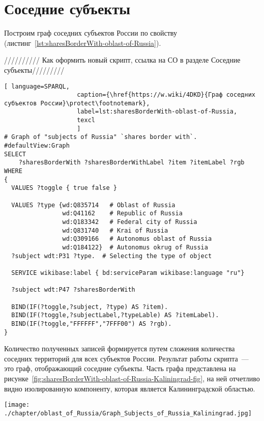 \section{Соседние субъекты}

Построим граф соседних субъектов России по свойству  (листинг~\protect\ref{lst:sharesBorderWith-oblast-of-Russia}).

////////// Как оформить новый скрипт, ссылка на СО в разделе Соседние субъекты/////////

\begin{lstlisting}[ language=SPARQL, 
                    caption={\href{https://w.wiki/4DKD}{Граф соседних субъектов России}\protect\footnotemark},
                    label=lst:sharesBorderWith-oblast-of-Russia,
                    texcl 
                    ]
# Graph of "subjects of Russia" `shares border with`. 
#defaultView:Graph
SELECT 
    ?sharesBorderWith ?sharesBorderWithLabel ?item ?itemLabel ?rgb
WHERE
{
  VALUES ?toggle { true false }
  
  VALUES ?type {wd:Q835714   # Oblast of Russia
                wd:Q41162    # Republic of Russia
                wd:Q183342   # Federal city of Russia
                wd:Q831740   # Krai of Russia
                wd:Q309166   # Autonomus oblast of Russia
                wd:Q184122}  # Autonomus okrug of Russia
  ?subject wdt:P31 ?type.  # Selecting the type of object  
  
  SERVICE wikibase:label { bd:serviceParam wikibase:language "ru"}
  
  ?subject wdt:P47 ?sharesBorderWith   
           
  BIND(IF(?toggle,?subject, ?type) AS ?item).
  BIND(IF(?toggle,?subjectLabel,?typeLable) AS ?itemLabel).
  BIND(IF(?toggle,"FFFFFF","7FFF00") AS ?rgb).
}
\end{lstlisting}%

Количество полученных записей формируется путем сложения количества соседних территорий для всех субъектов России. Результат работы скрипта~--- это граф, отображающий соседние субъекты. Часть графа представлена на рисунке~\ref{fig:sharesBorderWith-oblast-of-Russia-Kaliningrad-fig}, на ней отчетливо видно изолированную компоненту, которая является Калининградской областью.

\begin{fullwidth}
\begin{figure*}[h]
	\texttt{[image: ./chapter/oblast\_of\_Russia/Graph\_Subjects\_of\_Russia\_Kaliningrad.jpg]}
	\caption[Граф субъектов России. Калининград, 2021.]{Граф субъектов России. Калининград, 2021. Граф построен на основе данных, полученных с помощью запроса~\protect\ref{lst:sharesBorderWith-oblast-of-Russia}.}%
      \label{fig:sharesBorderWith-oblast-of-Russia-Kaliningrad-fig}%
\end{figure*} 
\end{fullwidth}

